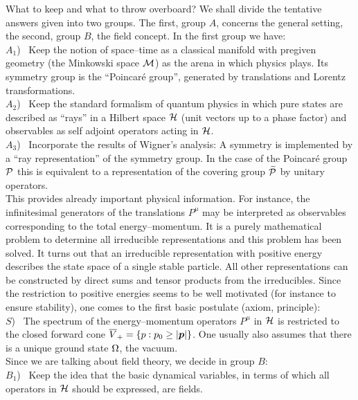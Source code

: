 What to keep and what to throw overboard? We shall divide the
tentative answers given into two groups. The first, 
group $A$,  concerns the
general setting, the second, 
group $B$, the field concept. In the first group we
have: \\[2mm]
  { $A_1$) \ Keep the notion of space--time as a classical manifold with
  pregiven geometry (the Minkowski space $\cal M$) as the arena in
  which physics plays. Its symmetry group is the ``Poincar\'e group'',
  generated by translations and Lorentz transformations.\\[2mm]
  $A_2$) \ Keep the standard formalism of quantum physics in which pure
  states are described as ``rays'' in a Hilbert space $\cal H$ (unit
  vectors up to a phase factor) and observables as self adjoint
  operators acting in $\cal H$.\\[2mm]
  $A_3$) \ Incorporate the results of Wigner's analysis: A symmetry is
  implemented by a ``ray representation'' of the symmetry group. In
  the case of the Poincar\'e group $\cal P$ this is equivalent to a
  representation of the covering group $\widetilde{\cal P}$ by unitary
  operators. \\[2mm]
\indent  This provides already important physical information. For
  instance, the infinitesimal generators of the translations $
  P^\mu$ may be interpreted as observables 
  corresponding to the total energy--momentum. It is a purely
  mathematical problem to determine all irreducible representations
  and this problem has been solved. It turns out that an irreducible
  representation with positive energy describes the state space of a
  single stable particle. All other representations can be constructed
  by direct sums and tensor products from the irreducibles.}  
Since the restriction to positive energies seems to be well motivated
(for instance to ensure stability), one comes to the first basic
postulate (axiom, principle): \\[2mm]
{ $S$) \  The spectrum of the energy--momentum operators $P^\mu$
in $\cal H$ is restricted to the closed forward cone 
$\overline{V}_+ = \{ p : p_0 \geq |\mbox{{\boldmath $p$}} | \}$. 
One usually also assumes that there is a unique ground state 
${\Omega}$, the vacuum.} \\[2mm]
\indent 
Since we are talking about field theory, we decide in group $B$:\\[2mm]
{ $B_1$) \  Keep the idea that the basic dynamical variables, in terms
of which all operators in $\cal H$ should be expressed, are fields.} \\[2mm]
